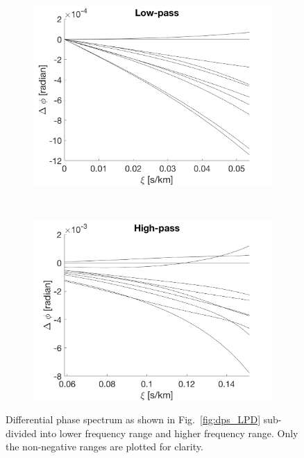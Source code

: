 \begin{figure}[tbp]	
    \begin{subfigure}[b]{0.49\textwidth}
        \includegraphics[width=\textwidth]{./Figures/Methods/LPD4-Relative_phase_angle_L.png}
    \end{subfigure}
	~
    \begin{subfigure}[b]{0.49\textwidth}
        \includegraphics[width=\textwidth]{./Figures/Methods/LPD4-Relative_phase_angle_H.png}
    \end{subfigure}	
    
    \caption[Low-pass and high-pass filters]
    {Differential phase spectrum as shown in Fig.~\ref{fig:dps_LPD} sub-divided into lower frequency range and higher frequency range. Only the non-negative ranges are plotted for clarity.}
\label{fig:low-high-pass_lpd}
\end{figure}    

